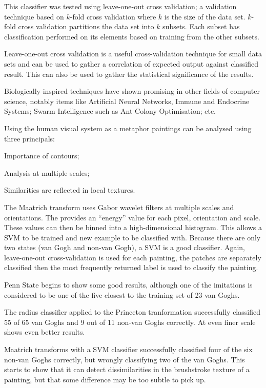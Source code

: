 \documentclass[conference]{IEEEtran}
\begin{document}
This classifier was tested using leave-one-out cross validation; a validation
technique based on $k$-fold cross validation where $k$ is the size of the data
set. $k$-fold cross validation partitions the data set into $k$ subsets. Each
subset has classification performed on its elements based on training from the
other subsets.

Leave-one-out cross validation is a useful cross-validation technique for small
data sets and can be used to gather a correlation of expected output against
classified result. This can also be used to gather the statistical significance
of the results.

Biologically inspired techniques have shown promising in other fields of
computer science, notably items like Artificial Neural Networks, Immune and
Endocrine Systems; Swarm Intelligence such as Ant Colony Optimisation; etc.

Using the human visual system as a metaphor paintings can be analysed using
three principals:
\begin{inparaenum}[1)]
\item Importance of contours;
\item Analysis at multiple scales;
\item Similarities are reflected in local textures.
\end{inparaenum}

The Maatrich transform uses Gabor wavelet filters at multiple scales and
orientations. The provides an ``energy'' value for each pixel, orientation and
scale. These values can then be binned into a high-dimensional histogram. This
allows a \gls{SVM} to be trained and new example to be classified
with. Because there are only two states (van Gogh and non-van Gogh), a
\gls{SVM} is a good classifier. Again, leave-one-out cross-validation is used
for each painting, the patches are separately classified then the most
frequently returned label is used to classify the painting.

Penn State begins to show some good results, although one of the imitations is
considered to be one of the five closest to the training set of 23 van Goghs.

The radius classifier applied to the Princeton tranformation successfully
classified 55 of 65 van Goghs and 9 out of 11 non-van Goghs correctly. At even
finer scale shows even better results.

Maatrich transforms with a \gls{SVM} classifier successfully classified four of
the six non-van Goghs correctly, but wrongly classifying two of the van Goghs.
This starts to show that it can detect dissimilarities in the brushstroke
texture of a painting, but that some difference may be too subtle to pick up.
\end{document}
